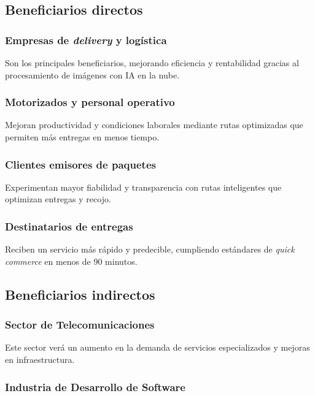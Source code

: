 \subsection{Beneficiarios directos}

\subsubsection{Empresas de \textit{delivery} y logística}

Son los principales beneficiarios, mejorando eficiencia y rentabilidad gracias al procesamiento de imágenes con IA en la nube.

\subsubsection{Motorizados y personal operativo}

Mejoran productividad y condiciones laborales mediante rutas optimizadas que permiten más entregas en menos tiempo.

\subsubsection{Clientes emisores de paquetes}

Experimentan mayor fiabilidad y transparencia con rutas inteligentes que optimizan entregas y recojo.

\subsubsection{Destinatarios de entregas}

Reciben un servicio más rápido y predecible, cumpliendo estándares de \textit{quick commerce} en menos de 90 minutos.

\subsection{Beneficiarios indirectos}

\subsubsection{Sector de Telecomunicaciones}

Este sector verá un aumento en la demanda de servicios especializados y mejoras en infraestructura.

\subsubsection{Industria de Desarrollo de Software}

